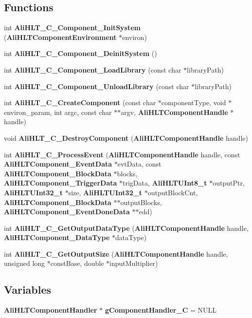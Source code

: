\subsection*{Functions}
\begin{CompactItemize}
\item 
int {\bf Ali\-HLT\_\-C\_\-Component\_\-Init\-System} ({\bf Ali\-HLTComponent\-Environment} $\ast$environ)
\item 
int {\bf Ali\-HLT\_\-C\_\-Component\_\-Deinit\-System} ()
\item 
int {\bf Ali\-HLT\_\-C\_\-Component\_\-Load\-Library} (const char $\ast$library\-Path)
\item 
int {\bf Ali\-HLT\_\-C\_\-Component\_\-Unload\-Library} (const char $\ast$library\-Path)
\item 
int {\bf Ali\-HLT\_\-C\_\-Create\-Component} (const char $\ast$component\-Type, void $\ast$environ\_\-param, int argc, const char $\ast$$\ast$argv, {\bf Ali\-HLTComponent\-Handle} $\ast$handle)
\item 
void {\bf Ali\-HLT\_\-C\_\-Destroy\-Component} ({\bf Ali\-HLTComponent\-Handle} handle)
\item 
int {\bf Ali\-HLT\_\-C\_\-Process\-Event} ({\bf Ali\-HLTComponent\-Handle} handle, const {\bf Ali\-HLTComponent\_\-Event\-Data} $\ast$evt\-Data, const {\bf Ali\-HLTComponent\_\-Block\-Data} $\ast$blocks, {\bf Ali\-HLTComponent\_\-Trigger\-Data} $\ast$trig\-Data, {\bf Ali\-HLTUInt8\_\-t} $\ast$output\-Ptr, {\bf Ali\-HLTUInt32\_\-t} $\ast$size, {\bf Ali\-HLTUInt32\_\-t} $\ast$output\-Block\-Cnt, {\bf Ali\-HLTComponent\_\-Block\-Data} $\ast$$\ast$output\-Blocks, {\bf Ali\-HLTComponent\_\-Event\-Done\-Data} $\ast$$\ast$edd)
\item 
int {\bf Ali\-HLT\_\-C\_\-Get\-Output\-Data\-Type} ({\bf Ali\-HLTComponent\-Handle} handle, {\bf Ali\-HLTComponent\_\-Data\-Type} $\ast$data\-Type)
\item 
int {\bf Ali\-HLT\_\-C\_\-Get\-Output\-Size} ({\bf Ali\-HLTComponent\-Handle} handle, unsigned long $\ast$const\-Base, double $\ast$input\-Multiplier)
\end{CompactItemize}
\subsection*{Variables}
\begin{CompactItemize}
\item 
{\bf Ali\-HLTComponent\-Handler} $\ast$ {\bf g\-Component\-Handler\_\-C} = NULL
\end{CompactItemize}


